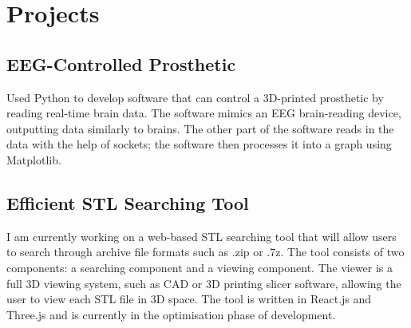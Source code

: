 \documentclass{article}
\begin{document}
\noindent
\begin{minipage}[t]{1\textwidth}
    \section{Projects}
    \subsection{EEG-Controlled Prosthetic}
    \vspace{-0.5em} %
    \normalsize{Used Python to develop software that can control a 3D-printed prosthetic
    by reading real-time brain data. The software mimics an EEG brain-reading device, outputting data similarly to brains. The other part of the software reads
    in the data with the help of sockets; the software then processes
    it into a graph using Matplotlib.}
    \vspace{0.5em} %

    \subsection{Efficient STL Searching Tool}
    \vspace{-0.5em} %
    \normalsize{I am currently working on a web-based STL searching tool that will allow users to search through archive file formats such as .zip or .7z. The tool consists of two components: a searching component and a viewing component. The viewer is a full 3D viewing system, such as CAD or 3D printing slicer software, allowing the user to view each STL file in 3D space. The tool is written in React.js and Three.js and is currently in the optimisation phase of development.}
    \vspace{0.5em} %
\end{minipage}
\end{document}
